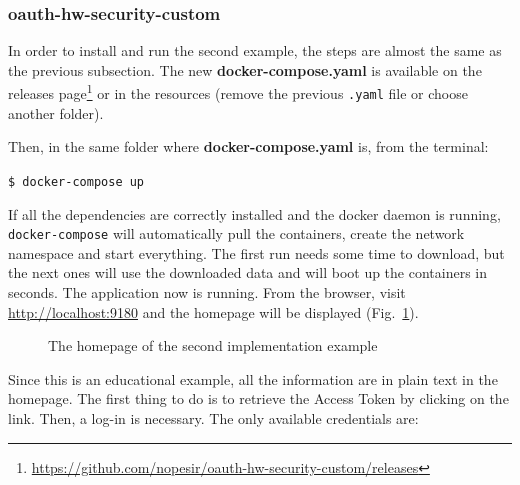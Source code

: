 \documentclass[a4paper,12pt]{article}
\def\myfig#1{Fig.~#1\xspace}
\begin{document}
\subsubsection{oauth-hw-security-custom}
In order to install and run the second example, the steps are almost the same as the previous subsection. The new \textbf{docker-compose.yaml} is available on the releases page\footnote{\url{https://github.com/nopesir/oauth-hw-security-custom/releases}} or in the resources (remove the previous \texttt{.yaml} file or choose another folder).

Then, in the same folder where \textbf{docker-compose.yaml} is, from the terminal:

\quad \texttt{\$ docker-compose up}

If all the dependencies are correctly installed and the docker daemon is running, \texttt{docker-compose} will automatically pull the containers, create the network namespace and start everything. 
The first run needs some time to download, but the next ones will use the downloaded data and will boot up the containers in seconds. The application now is running. From the browser, visit \url{http://localhost:9180} and the homepage will be displayed (\myfig{\ref{fig:home2}}).

\begin{figure}[ht]
    \centering
    \caption{The homepage of the second implementation example}
    \label{fig:home2}
\end{figure}

Since this is an educational example, all the information are in plain text in the homepage. The first thing to do is to retrieve the Access Token by clicking on the link. Then, a log-in is necessary. The only available credentials are:
\end{document}
